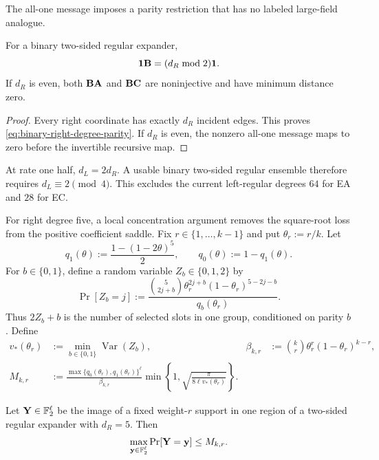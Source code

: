 The all-one message imposes a parity restriction that has no labeled
large-field analogue.

\begin{proposition}
\label{prop:binary-right-degree-parity}
For a binary two-sided regular expander,
\begin{equation}
 \mathbf 1\mathbf B=(d_R\bmod 2)\mathbf 1.
 \label{eq:binary-right-degree-parity}
\end{equation}
If $d_R$ is even, both $\mathbf B\mathbf A$ and $\mathbf B\mathbf C$ are noninjective and have minimum
distance zero.
\end{proposition}

\begin{proof}
Every right coordinate has exactly $d_R$ incident edges.  This proves
\eqref{eq:binary-right-degree-parity}.  If $d_R$ is even, the nonzero
all-one message maps to zero before the invertible recursive map.
\end{proof}

At rate one half, $d_L=2d_R$.  A usable binary two-sided regular ensemble
therefore requires $d_L\equiv2\pmod4$.  This excludes the current left-regular
degrees $64$ for EA and $28$ for EC.

For right degree five, a local concentration argument removes the
square-root loss from the positive coefficient saddle.  Fix
$r\in\{1,\ldots,k-1\}$ and put $\theta_r:=r/k$.  Let
\begin{equation}
 q_1(\theta):=\frac{1-(1-2\theta)^5}{2},
 \qquad q_0(\theta):=1-q_1(\theta).
 \label{eq:degree-five-parity-probabilities}
\end{equation}
For $b\in\{0,1\}$, define a random variable $Z_b\in\{0,1,2\}$ by
\begin{equation}
 \Pr[Z_b=j]:=
 \frac{\binom{5}{2j+b}\theta_r^{2j+b}(1-\theta_r)^{5-2j-b}}
 {q_b(\theta_r)}.
 \label{eq:degree-five-conditioned-half-count}
\end{equation}
Thus $2Z_b+b$ is the number of selected slots in one group, conditioned on
parity $b$.  Define
\begin{align}
 v_*(\theta_r)&:=\min_{b\in\{0,1\}}\operatorname{Var}(Z_b),
&
 \beta_{k,r}&:=\binom{k}{r}\theta_r^r(1-\theta_r)^{k-r},
 \label{eq:degree-five-local-parameters}\\
 M_{k,r}&:=
 \frac{\max\{q_0(\theta_r),q_1(\theta_r)\}^{\ell}}{\beta_{k,r}}
 \min\left\{1,\sqrt{\frac{\pi}{8\ell v_*(\theta_r)}}\right\}.
 \label{eq:degree-five-point-mass}
\end{align}

\begin{lemma}
\label{lem:degree-five-point-mass}
Let $\mathbf Y\in\mathbb F_2^\ell$ be the image of a fixed weight-$r$ support in
one region of a two-sided regular expander with $d_R=5$.  Then
\begin{equation}
 \max_{\mathbf y\in\mathbb F_2^\ell}\Pr[\mathbf Y=\mathbf y]\leq M_{k,r}.
 \label{eq:degree-five-regional-point-mass}
\end{equation}
\end{lemma}

